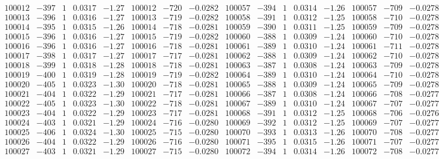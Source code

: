 \documentclass[11pt,reqno,a4letter]{article}
\numberwithin{figure}{section}
\numberwithin{table}{section}
\theoremstyle{plain}
\numberwithin{theorem}{section}
\theoremstyle{definition}
\begin{document}
\begin{table}[ht!]
\begin{equation*}
{\begin{array}{ccccc|ccc||ccccc|ccc}
100012 & -397 & 1 & 0.0317 & -1.27 & 100012 & -720 & -0.0282 & 100057 & -394 & 1 & 0.0314 & -1.26 & 100057 & -709 & -0.0278  \\
100013 & -396 & 1 & 0.0316 & -1.27 & 100013 & -719 & -0.0282 & 100058 & -391 & 1 & 0.0312 & -1.25 & 100058 & -710 & -0.0278  \\
100014 & -395 & 1 & 0.0315 & -1.26 & 100014 & -718 & -0.0281 & 100059 & -390 & 1 & 0.0311 & -1.25 & 100059 & -709 & -0.0278  \\
100015 & -396 & 1 & 0.0316 & -1.27 & 100015 & -719 & -0.0282 & 100060 & -388 & 1 & 0.0309 & -1.24 & 100060 & -710 & -0.0278  \\
100016 & -396 & 1 & 0.0316 & -1.27 & 100016 & -718 & -0.0281 & 100061 & -389 & 1 & 0.0310 & -1.24 & 100061 & -711 & -0.0278  \\
100017 & -398 & 1 & 0.0317 & -1.27 & 100017 & -717 & -0.0281 & 100062 & -388 & 1 & 0.0309 & -1.24 & 100062 & -710 & -0.0278  \\
100018 & -399 & 1 & 0.0318 & -1.28 & 100018 & -718 & -0.0281 & 100063 & -387 & 1 & 0.0308 & -1.24 & 100063 & -709 & -0.0278  \\
100019 & -400 & 1 & 0.0319 & -1.28 & 100019 & -719 & -0.0282 & 100064 & -389 & 1 & 0.0310 & -1.24 & 100064 & -710 & -0.0278  \\
100020 & -405 & 1 & 0.0323 & -1.30 & 100020 & -718 & -0.0281 & 100065 & -388 & 1 & 0.0309 & -1.24 & 100065 & -709 & -0.0278  \\
100021 & -404 & 1 & 0.0322 & -1.29 & 100021 & -717 & -0.0281 & 100066 & -387 & 1 & 0.0308 & -1.24 & 100066 & -708 & -0.0277  \\
100022 & -405 & 1 & 0.0323 & -1.30 & 100022 & -718 & -0.0281 & 100067 & -389 & 1 & 0.0310 & -1.24 & 100067 & -707 & -0.0277  \\
100023 & -404 & 1 & 0.0322 & -1.29 & 100023 & -717 & -0.0281 & 100068 & -391 & 1 & 0.0312 & -1.25 & 100068 & -706 & -0.0276  \\
100024 & -403 & 1 & 0.0321 & -1.29 & 100024 & -716 & -0.0280 & 100069 & -392 & 1 & 0.0312 & -1.25 & 100069 & -707 & -0.0277  \\
100025 & -406 & 1 & 0.0324 & -1.30 & 100025 & -715 & -0.0280 & 100070 & -393 & 1 & 0.0313 & -1.26 & 100070 & -708 & -0.0277  \\
100026 & -404 & 1 & 0.0322 & -1.29 & 100026 & -716 & -0.0280 & 100071 & -395 & 1 & 0.0315 & -1.26 & 100071 & -707 & -0.0277  \\
100027 & -403 & 1 & 0.0321 & -1.29 & 100027 & -715 & -0.0280 & 100072 & -394 & 1 & 0.0314 & -1.26 & 100072 & -708 & -0.0277  \\

\end{array}}
\end{equation*}
\end{table}
\end{document}
